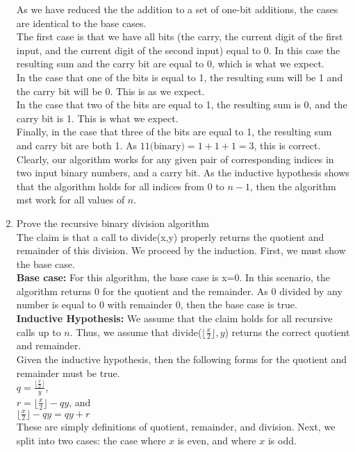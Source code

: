 \documentclass{article}
\begin{document}
\begin{enumerate}
	As we have reduced the the addition to a set of one-bit additions, the cases are identical to the base cases. 
	\\The first case is that we have all bits (the carry, the current digit of the first input, and the current digit of the second input) equal to 0. In this case the resulting sum and the carry bit are equal to 0, which is what we expect.
	\\ In the case that one of the bits is equal to 1, the resulting sum will be 1 and the carry bit will be 0. This is as we expect.
	\\ In the case that two of the bits are equal to 1, the resulting sum is 0, and the carry bit is 1. This is what we expect.
	\\ Finally, in the case that three of the bits are equal to 1, the resulting sum and carry bit are both 1. As $11\text{(binary)}=1+1+1=3$, this is correct.
	\\ Clearly, our algorithm works for any given pair of corresponding indices in two input binary numbers, and a carry bit. As the inductive hypothesis shows that the algorithm holds for all indices from 0 to $n-1$, then the algorithm mst work for all values of $n$.
	\item Prove the recursive binary division algorithm \\
	The claim is that a call to divide(x,y) properly returns the quotient and remainder of this division. We proceed by the induction. First, we must show the base case. 
	\\ \textbf{Base case:}	For this algorithm, the base case is x=0. In this scenario, the algorithm returns 0 for the quotient and the remainder. As 0 divided by any number is equal to 0 with remainder 0, then the base case is true.
	\\ \textbf{Inductive Hypothesis:} We assume that the claim holds for all recursive calls up to $n$. Thus, we assume that divide($\lfloor{\frac{x}{2}}\rfloor,y$) returns the correct quotient and remainder.
	\\ Given the inductive hypothesis, then the following forms for the quotient and remainder must be true.
	\\$q=\frac{\lfloor{\frac{x}{2}}\rfloor}{y}$,
	\\ $r = \lfloor{\frac{x}{2}}\rfloor-qy$, and 
	\\ $\lfloor{\frac{x}{2}}\rfloor-qy=qy+r$
	\\ These are simply definitions of quotient, remainder, and division. Next, we split into two cases: the case where $x$ is even, and where $x$ is odd.

\end{enumerate}
\end{document}
